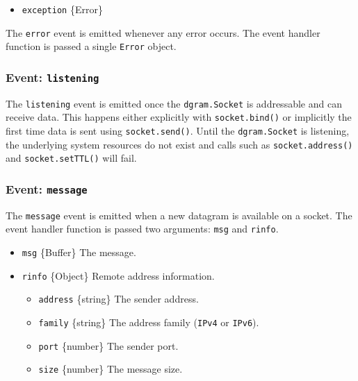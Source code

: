 \begin{itemize}
\tightlist
\item
  \texttt{exception} \{Error\}
\end{itemize}

The \texttt{\textquotesingle{}error\textquotesingle{}} event is emitted
whenever any error occurs. The event handler function is passed a single
\texttt{Error} object.

\subsubsection{\texorpdfstring{Event:
\texttt{\textquotesingle{}listening\textquotesingle{}}}{Event: \textquotesingle listening\textquotesingle{}}}\label{event-listening}

The \texttt{\textquotesingle{}listening\textquotesingle{}} event is
emitted once the \texttt{dgram.Socket} is addressable and can receive
data. This happens either explicitly with \texttt{socket.bind()} or
implicitly the first time data is sent using \texttt{socket.send()}.
Until the \texttt{dgram.Socket} is listening, the underlying system
resources do not exist and calls such as \texttt{socket.address()} and
\texttt{socket.setTTL()} will fail.

\subsubsection{\texorpdfstring{Event:
\texttt{\textquotesingle{}message\textquotesingle{}}}{Event: \textquotesingle message\textquotesingle{}}}\label{event-message}

The \texttt{\textquotesingle{}message\textquotesingle{}} event is
emitted when a new datagram is available on a socket. The event handler
function is passed two arguments: \texttt{msg} and \texttt{rinfo}.

\begin{itemize}
\tightlist
\item
  \texttt{msg} \{Buffer\} The message.
\item
  \texttt{rinfo} \{Object\} Remote address information.

  \begin{itemize}
  \tightlist
  \item
    \texttt{address} \{string\} The sender address.
  \item
    \texttt{family} \{string\} The address family
    (\texttt{\textquotesingle{}IPv4\textquotesingle{}} or
    \texttt{\textquotesingle{}IPv6\textquotesingle{}}).
  \item
    \texttt{port} \{number\} The sender port.
  \item
    \texttt{size} \{number\} The message size.
  \end{itemize}
\end{itemize}

